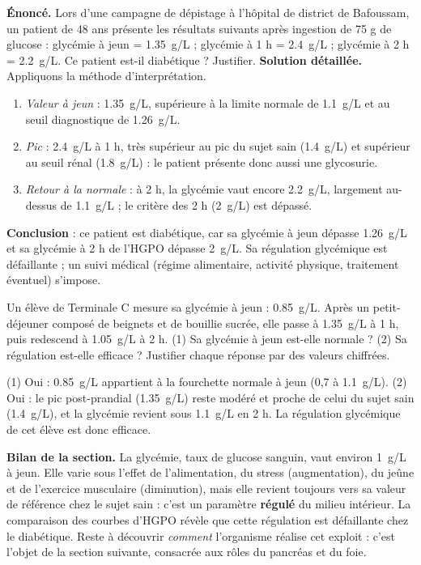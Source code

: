 \documentclass[11pt]{article}
\begin{document}
\begin{exoresolu}
\textbf{Énoncé.} Lors d'une campagne de dépistage à l'hôpital de district de Bafoussam, un patient de 48 ans présente les résultats suivants après ingestion de 75 g de glucose : glycémie à jeun = \SI{1,35}{g/L} ; glycémie à 1 h = \SI{2,4}{g/L} ; glycémie à 2 h = \SI{2,2}{g/L}. Ce patient est-il diabétique ? Justifier.
\tcblower
\textbf{Solution détaillée.} Appliquons la méthode d'interprétation.
\begin{enumerate}
\item \emph{Valeur à jeun} : \SI{1,35}{g/L}, supérieure à la limite normale de \SI{1,1}{g/L} et au seuil diagnostique de \SI{1,26}{g/L}.
\item \emph{Pic} : \SI{2,4}{g/L} à 1 h, très supérieur au pic du sujet sain (\SI{1,4}{g/L}) et supérieur au seuil rénal (\SI{1,8}{g/L}) : le patient présente donc aussi une glycosurie.
\item \emph{Retour à la normale} : à 2 h, la glycémie vaut encore \SI{2,2}{g/L}, largement au-dessus de \SI{1,1}{g/L} ; le critère des 2 h (\SI{2}{g/L}) est dépassé.
\end{enumerate}
\textbf{Conclusion} : ce patient est diabétique, car sa glycémie à jeun dépasse \SI{1,26}{g/L} et sa glycémie à 2 h de l'HGPO dépasse \SI{2}{g/L}. Sa régulation glycémique est défaillante ; un suivi médical (régime alimentaire, activité physique, traitement éventuel) s'impose.
\end{exoresolu}

\begin{exercice}
Un élève de Terminale C mesure sa glycémie à jeun : \SI{0,85}{g/L}. Après un petit-déjeuner composé de beignets et de bouillie sucrée, elle passe à \SI{1,35}{g/L} à 1 h, puis redescend à \SI{1,05}{g/L} à 2 h. (1) Sa glycémie à jeun est-elle normale ? (2) Sa régulation est-elle efficace ? Justifier chaque réponse par des valeurs chiffrées.
\end{exercice}

\begin{corrige}
(1) Oui : \SI{0,85}{g/L} appartient à la fourchette normale à jeun (0,7 à \SI{1,1}{g/L}). (2) Oui : le pic post-prandial (\SI{1,35}{g/L}) reste modéré et proche de celui du sujet sain (\SI{1,4}{g/L}), et la glycémie revient sous \SI{1,1}{g/L} en 2 h. La régulation glycémique de cet élève est donc efficace.
\end{corrige}

\textbf{Bilan de la section.} La glycémie, taux de glucose sanguin, vaut environ \SI{1}{g/L} à jeun. Elle varie sous l'effet de l'alimentation, du stress (augmentation), du jeûne et de l'exercice musculaire (diminution), mais elle revient toujours vers sa valeur de référence chez le sujet sain : c'est un paramètre \textbf{régulé} du milieu intérieur. La comparaison des courbes d'HGPO révèle que cette régulation est défaillante chez le diabétique. Reste à découvrir \emph{comment} l'organisme réalise cet exploit : c'est l'objet de la section suivante, consacrée aux rôles du pancréas et du foie.
\end{document}
